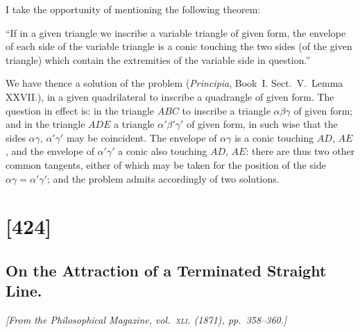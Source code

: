 \documentclass[11pt,a4paper]{article}
\theoremstyle{plain}
\theoremstyle{definition}
\begin{document}
\clearpage

I take the opportunity of mentioning the following theorem:

``If in a given triangle we inscribe a variable triangle of given form, the envelope
of each side of the variable triangle is a conic touching the two sides (of the given
triangle) which contain the extremities of the variable side in question.''

We have thence a solution of the problem (\textit{Principia}, Book~I. Sect.~V.\ Lemma
XXVII.), in a given quadrilateral to inscribe a quadrangle of given form.  The question
in effect is: in the triangle $ABC$ to inscribe a triangle $\alpha\beta\gamma$ of given form; and in
the triangle $ADE$ a triangle $\alpha'\beta'\gamma'$ of given form, in such wise that the sides $\alpha\gamma$, $\alpha'\gamma'$
may be coincident.  The envelope of $\alpha\gamma$ is a conic touching $AD$, $AE$, and the envelope
of $\alpha'\gamma'$ a conic also touching $AD$, $AE$: there are thus two other common tangents, either
of which may be taken for the position of the side $\alpha\gamma = \alpha'\gamma'$; and the problem admits
accordingly of two solutions.

\clearpage

\section{[424]}
\subsection{On the Attraction of a Terminated Straight Line.}

\begin{center}
\textit{[From the Philosophical Magazine, vol.~\textsc{xli}. (1871), pp.~358--360.]}
\end{center}
\end{document}
